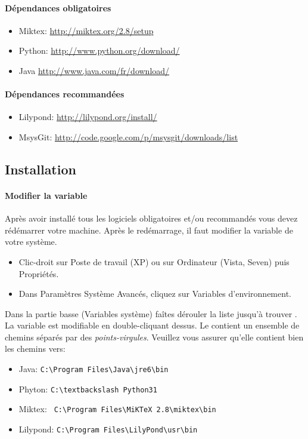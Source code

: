 \documentclass[versionenligne]{patacrep}
\begin{document}
\paragraph{Dépendances obligatoires}
\begin{itemize}
 \item Miktex: \url{http://miktex.org/2.8/setup}
 \item Python: \url{http://www.python.org/download/}
 \item Java \url{http://www.java.com/fr/download/}
\end{itemize}

\paragraph{Dépendances recommandées}
\begin{itemize} 
  \item Lilypond: \url{http://lilypond.org/install/}
  \item MsysGit: \url{http://code.google.com/p/msysgit/downloads/list}
\end{itemize}

\subsection{Installation}\label{sec:install-win}

\paragraph{Modifier la variable }
Après avoir installé tous les logiciels obligatoires et/ou recommandés
vous devez rédémarrer votre machine.  Après le redémarrage, il faut
modifier la variable  de votre système.
\begin{itemize}
\item Clic-droit sur Poste de travail (XP) ou sur Ordinateur (Vista, Seven) puis Propriétés. 
\item Dans Paramètres Système Avancés, cliquez sur Variables d'environnement. 
\end{itemize}

Dans la partie basse (Variables système) faîtes dérouler la liste
jusqu'à trouver . La variable est modifiable en
double-cliquant dessus. Le  contient un ensemble de
chemins séparés par des \emph{points-virgules}.  Veuillez vous assurer
qu'elle contient bien les chemins vers:
\begin{itemize}
 \item Java: \verb#C:\Program Files\Java\jre6\bin#
 \item Phyton: \verb#C:\textbackslash Python31#
 \item Miktex: \verb# C:\Program Files\MiKTeX 2.8\miktex\bin#
 \item Lilypond: \verb#C:\Program Files\LilyPond\usr\bin#
\end{itemize}                     
\end{document}

